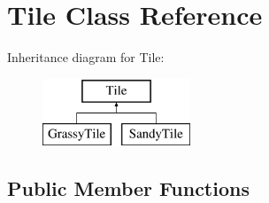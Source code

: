 \hypertarget{classTile}{}\section{Tile Class Reference}
\label{classTile}
Inheritance diagram for Tile\+:\begin{figure}[H]
\begin{center}
\leavevmode
\includegraphics[height=2.000000cm]{classTile}
\end{center}
\end{figure}
\subsection*{Public Member Functions}
